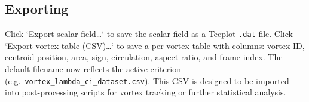 \subsection{Exporting}

Click `Export scalar field\ldots` to save the scalar field as a Tecplot \texttt{.dat} file. Click `Export vortex table (CSV)\ldots` to save a per-vortex table with columns: vortex ID, centroid position, area, sign, circulation, aspect ratio, and frame index. The default filename now reflects the active criterion (e.g.\ \texttt{vortex\_lambda\_ci\_dataset.csv}). This CSV is designed to be imported into post-processing scripts for vortex tracking or further statistical analysis.

